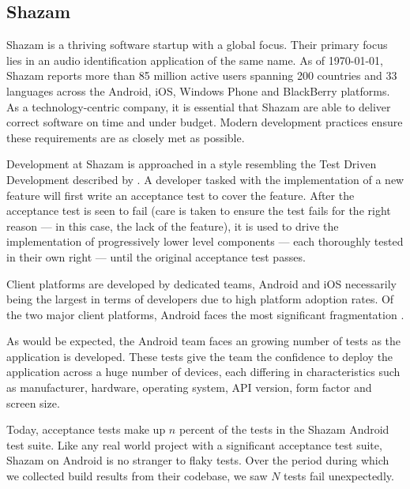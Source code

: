 

\subsection{Shazam}

Shazam is a thriving software startup with a global focus. Their primary focus
lies in an audio identification application of the same name. As of \today,
Shazam reports more than 85 million active users spanning 200 countries and 33
languages across the Android, iOS, Windows Phone and BlackBerry platforms. As a
technology-centric company, it is essential that Shazam are able to deliver
correct software on time and under budget. Modern development practices ensure
these requirements are as closely met as possible.

Development at Shazam is approached in a style resembling the Test Driven
Development described by \citet*{freeman2009growing}. A developer tasked with
the implementation of a new feature will first write an acceptance test to cover
the feature. After the acceptance test is seen to fail (care is taken to ensure
the test fails for the right reason --- in this case, the lack of the feature),
it is used to drive the implementation of progressively lower level components
--- each thoroughly tested in their own right --- until the original acceptance
test passes.

Client platforms are developed by dedicated teams, Android and iOS necessarily
being the largest in terms of developers due to high platform adoption rates. Of
the two major client platforms, Android faces the most significant fragmentation
\cite{AndroidFragmentationVisualized}.

As would be expected, the Android team faces an growing number of tests as the
application is developed.  These tests give the team the confidence to deploy the
application across a huge number of devices, each differing in characteristics
such as manufacturer, hardware, operating system, API version, form factor and
screen size.

Today, acceptance tests make up $n$ percent of the tests in the Shazam Android
test suite. Like any real world project with a significant acceptance test
suite, Shazam on Android is no stranger to flaky tests. Over the period
 during which we collected build results
from their codebase, we saw $N$ tests fail unexpectedly.


